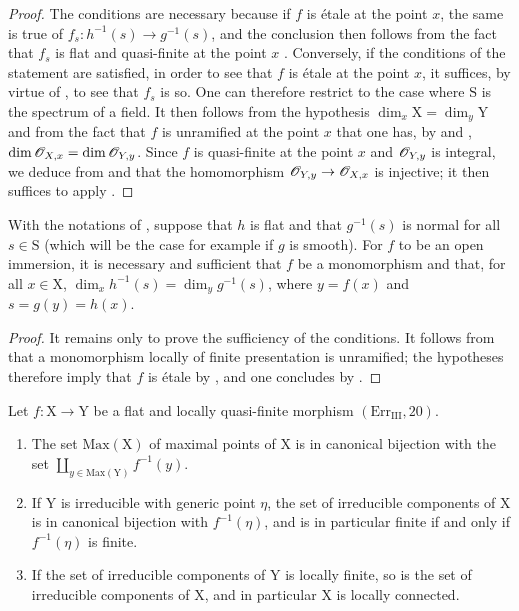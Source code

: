 \begin{proof}
The conditions are necessary because if $f$ is \'etale at the point $x$, the same is true of $f_s:h^{-1}(s)\to g^{-1}(s)$, and the conclusion then follows from the fact that $f_s$ is flat and quasi-finite at the point $x$ .
Conversely, if the conditions of the statement are satisfied, in order to see that $f$ is \'etale at the point $x$, it suffices, by virtue of , to see that $f_s$ is so.
One can therefore restrict to the case where $\mathrm{S}$ is the spectrum of a field.
It then follows from the hypothesis $\dim_x\mathrm{X}=\dim_y\mathrm{Y}$ and from the fact that $f$ is unramified at the point $x$ that one has, by  and , $\dim\mathscr{O}_{X,x}=\dim\mathscr{O}_{Y,y}$. Since $f$ is quasi-finite at the point $x$ and $\mathscr{O}_{Y,y}$ is integral, we deduce from  and  that the homomorphism $\mathscr{O}_{Y,y}\to\mathscr{O}_{X,x}$ is injective; it then suffices to apply .
\end{proof}

\begin{corollary}[18.10.5]
\label{IV.18.10.5}
With the notations of , suppose that $h$ is flat and that $g^{-1}(s)$ is normal for all $s\in\mathrm{S}$ (which will be the case for example if $g$ is smooth).
For $f$ to be an open immersion, it is necessary and sufficient that $f$ be a monomorphism and that, for all $x\in\mathrm{X}$, $\dim_xh^{-1}(s)=\dim_yg^{-1}(s)$, where $y=f(x)$ and $s=g(y)=h(x)$.
\end{corollary}

\begin{proof}
It remains only to prove the sufficiency of the conditions. It follows from  that a monomorphism locally of finite presentation is unramified; the hypotheses therefore imply that $f$ is \'etale by , and one concludes by .
\end{proof}

\begin{lemma}[18.10.6]
\label{IV.18.10.6}
Let $f:\mathrm{X}\to\mathrm{Y}$ be a flat and locally quasi-finite morphism $(\mathrm{Err}_{\mathrm{III}}, 20)$.
\begin{enumerate}[label=(\roman*)]
  \item The set $\mathrm{Max}(\mathrm{X})$ of maximal points of $\mathrm{X}$ is in canonical bijection with the set $\coprod_{y\in\mathrm{Max}(\mathrm{Y})}f^{-1}(y)$.
  \item If $\mathrm{Y}$ is irreducible with generic point $\eta$, the set of irreducible components of $\mathrm{X}$ is in canonical bijection with $f^{-1}(\eta)$, and is in particular finite if and only if $f^{-1}(\eta)$ is finite.
  \item If the set of irreducible components of $\mathrm{Y}$ is locally finite, so is the set of irreducible components of $\mathrm{X}$, and in particular $\mathrm{X}$ is locally connected.
\end{enumerate}
\end{lemma}


